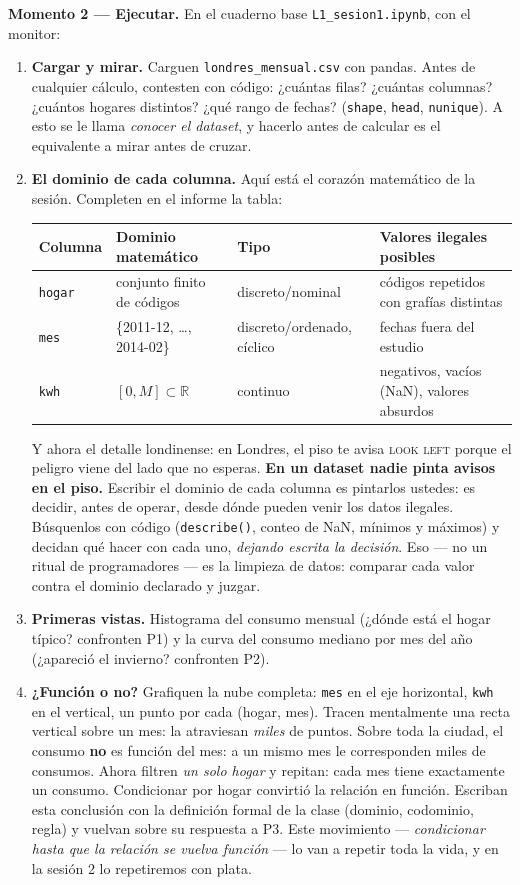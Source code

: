 \documentclass[12pt,letterpaper]{article}
\begin{document}
\textbf{Momento 2 --- Ejecutar.} En el cuaderno base \texttt{L1\_sesion1.ipynb}, con el monitor:

\begin{enumerate}[label=\arabic*.]
    \item \textbf{Cargar y mirar.} Carguen \texttt{londres\_mensual.csv} con pandas. Antes de cualquier cálculo, contesten con código: ¿cuántas filas? ¿cuántas columnas? ¿cuántos hogares distintos? ¿qué rango de fechas? (\texttt{shape}, \texttt{head}, \texttt{nunique}). A esto se le llama \emph{conocer el dataset}, y hacerlo antes de calcular es el equivalente a mirar antes de cruzar.
    \item \textbf{El dominio de cada columna.} Aquí está el corazón matemático de la sesión. Completen en el informe la tabla:
    \begin{center}
    \begin{tabularx}{\textwidth}{p{2.2cm}p{4.2cm}p{3.1cm}X}
    \toprule
    \textbf{Columna} & \textbf{Dominio matemático} & \textbf{Tipo} & \textbf{Valores ilegales posibles}\\
    \midrule
    \texttt{hogar} & conjunto finito de códigos & discreto/nominal & códigos repetidos con grafías distintas\\
    \texttt{mes} & \{2011-12, \ldots, 2014-02\} & discreto/ordenado, cíclico & fechas fuera del estudio\\
    \texttt{kwh} & $[0, M] \subset \mathbb{R}$ & continuo & negativos, vacíos (NaN), valores absurdos\\
    \bottomrule
    \end{tabularx}
    \end{center}
    Y ahora el detalle londinense: en Londres, el piso te avisa \textsc{look left} porque el peligro viene del lado que no esperas. \textbf{En un dataset nadie pinta avisos en el piso.} Escribir el dominio de cada columna es pintarlos ustedes: es decidir, antes de operar, desde dónde pueden venir los datos ilegales. Búsquenlos con código (\texttt{describe()}, conteo de NaN, mínimos y máximos) y decidan qué hacer con cada uno, \emph{dejando escrita la decisión}. Eso --- no un ritual de programadores --- es la limpieza de datos: comparar cada valor contra el dominio declarado y juzgar.
    \item \textbf{Primeras vistas.} Histograma del consumo mensual (¿dónde está el hogar típico? confronten P1) y la curva del consumo mediano por mes del año (¿apareció el invierno? confronten P2).
    \item \textbf{¿Función o no?} Grafiquen la nube completa: \texttt{mes} en el eje horizontal, \texttt{kwh} en el vertical, un punto por cada (hogar, mes). Tracen mentalmente una recta vertical sobre un mes: la atraviesan \emph{miles} de puntos. Sobre toda la ciudad, el consumo \textbf{no} es función del mes: a un mismo mes le corresponden miles de consumos. Ahora filtren \emph{un solo hogar} y repitan: cada mes tiene exactamente un consumo. Condicionar por hogar convirtió la relación en función. Escriban esta conclusión con la definición formal de la clase (dominio, codominio, regla) y vuelvan sobre su respuesta a P3. Este movimiento --- \emph{condicionar hasta que la relación se vuelva función} --- lo van a repetir toda la vida, y en la sesión 2 lo repetiremos con plata.

\end{enumerate}
\end{document}
